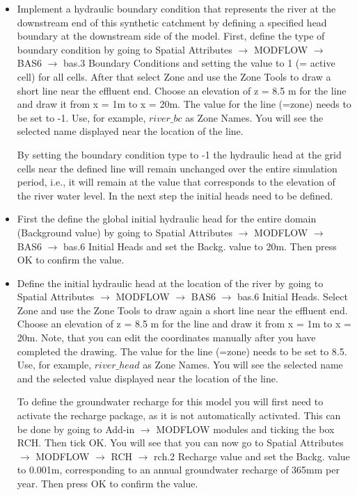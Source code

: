 \begin{itemize}
\item Implement a hydraulic boundary condition that represents the river at the downstream end of this synthetic catchment by defining a specified head boundary at the downstream side of the model. First, define the type of boundary condition by going to {\color{blue}Spatial Attributes} $\rightarrow$ {\color{blue}MODFLOW} $\rightarrow$ {\color{blue}BAS6} $\rightarrow$ {\color{blue}bas.3 Boundary Conditions} and setting the value to 1 (= active cell) for all cells. After that select {\color{blue}Zone} and use the {\color{blue}Zone Tools} to draw a short line near the effluent end. Choose an elevation of z = 8.5 m for the line and draw it from x = 1m to x = 20m. 
The value for the line (=zone) needs to be set to -1. Use, for example,
$river\_bc$ as {\color{blue}Zone Names}. You will see the selected name displayed near 
the location of the line.
  
By setting the boundary condition type to -1 the hydraulic head at the grid cells 
near the defined line will remain unchanged
over the entire simulation period, i.e., it will remain at the value that corresponds to the elevation of
the river water level. In the next step the initial heads need to be defined. 

\item First the define the global initial hydraulic head for the entire domain (Background value) by going to {\color{blue}Spatial Attributes} $\rightarrow$ {\color{blue}MODFLOW} $\rightarrow$ {\color{blue}BAS6} $\rightarrow$ {\color{blue}bas.6 Initial Heads} and set the
 {\color{blue}Backg.} value to 20m. Then press {\color{blue}OK} to confirm the value.  

\item Define the initial hydraulic head at the location of the river by going to {\color{blue}Spatial Attributes} $\rightarrow$ {\color{blue}MODFLOW} $\rightarrow$ {\color{blue}BAS6} $\rightarrow$ {\color{blue}bas.6 Initial Heads}.
Select {\color{blue}Zone} and use the {\color{blue}Zone Tools} to draw again a short line near the effluent end. Choose an elevation of z = 8.5 m for the line and draw it from x = 1m to x = 20m. 
Note, that you can edit the coordinates manually after you have completed the drawing.
The value for the line (=zone) needs to be set to 8.5. Use, for example,
$river\_head$ as {\color{blue}Zone Names}. You will see the selected name and the selected value
displayed near the location of the line.
  

To define the groundwater recharge for this model you will first need to activate the recharge package,
as it is not automatically activated.
This can be done by going to {\color{blue}Add-in} $\rightarrow$ {\color{blue}MODFLOW modules} 
and ticking the box {\color{blue}RCH}. Then tick {\color{blue}OK}.
You will see that you can now go to {\color{blue}Spatial Attributes} $\rightarrow$ {\color{blue}MODFLOW} $\rightarrow$ {\color{blue}RCH} $\rightarrow$ {\color{blue}rch.2 Recharge value} and set the {\color{blue}Backg.} value to 0.001m, corresponding to an annual groundwater recharge of 365mm per year.
Then press {\color{blue}OK} to confirm the value. 

\end{itemize}

